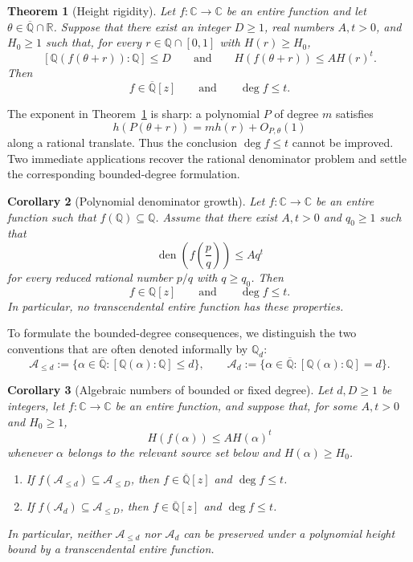 \documentclass[11pt]{amsart}
\newtheorem{theorem}{Theorem}[section]
\newtheorem{corollary}[theorem]{Corollary}
\theoremstyle{remark}
\newcommand{\Q}{\mathbb{Q}}
\newcommand{\R}{\mathbb{R}}
\newcommand{\C}{\mathbb{C}}
\newcommand{\Qbar}{\overline{\mathbb{Q}}}
\newcommand{\Aatmost}[1]{\mathcal{A}_{\leq #1}}
\newcommand{\Aexact}[1]{\mathcal{A}_{#1}}
\DeclareMathOperator{\den}{den}
\begin{document}
\begin{theorem}[Height rigidity]\label{thm:rigidity}
Let $f:\C\to\C$ be an entire function and let $\theta\in\Qbar\cap\R$. Suppose that there exist an integer $D\geq1$, real numbers $A,t>0$, and $H_0\geq1$ such that, for every $r\in\Q\cap[0,1]$ with $H(r)\geq H_0$,
\begin{equation}\label{eq:intro-assumptions}
[\Q(f(\theta+r)):\Q]\leq D
\qquad\text{and}\qquad
H(f(\theta+r))\leq A H(r)^t.
\end{equation}
Then
\[
f\in\Qbar[z]
\qquad\text{and}\qquad
\deg f\leq t.
\]
\end{theorem}

The exponent in Theorem~\ref{thm:rigidity} is sharp: a polynomial $P$ of degree $m$ satisfies
\[
h(P(\theta+r))=m h(r)+O_{P,\theta}(1)
\]
along a rational translate. Thus the conclusion $\deg f\leq t$ cannot be improved. Two immediate applications recover the rational denominator problem and settle the corresponding bounded-degree formulation.

\begin{corollary}[Polynomial denominator growth]\label{cor:rational}
Let $f:\C\to\C$ be an entire function such that $f(\Q)\subseteq\Q$. Assume that there exist $A,t>0$ and $q_0\geq1$ such that
\[
\den\!\left(f\!\left(\frac pq\right)\right)
\leq A q^t
\]
for every reduced rational number $p/q$ with $q\geq q_0$. Then
\[
f\in\Q[z]
\qquad\text{and}\qquad
\deg f\leq t.
\]
In particular, no transcendental entire function has these properties.
\end{corollary}

To formulate the bounded-degree consequences, we distinguish the two conventions that are often denoted informally by $\Q_d$:
\[
\Aatmost{d}
:=\{\alpha\in\Qbar:[\Q(\alpha):\Q]\leq d\},
\qquad
\Aexact{d}
:=\{\alpha\in\Qbar:[\Q(\alpha):\Q]=d\}.
\]

\begin{corollary}[Algebraic numbers of bounded or fixed degree]\label{cor:degree}
Let $d,D\geq1$ be integers, let $f:\C\to\C$ be an entire function, and suppose that, for some $A,t>0$ and $H_0\geq1$,
\[
H(f(\alpha))\leq A H(\alpha)^t
\]
whenever $\alpha$ belongs to the relevant source set below and $H(\alpha)\geq H_0$.

\begin{enumerate}
\item If $f(\Aatmost{d})\subseteq\Aatmost{D}$, then $f\in\Qbar[z]$ and $\deg f\leq t$.
\item If $f(\Aexact{d})\subseteq\Aatmost{D}$, then $f\in\Qbar[z]$ and $\deg f\leq t$.
\end{enumerate}

In particular, neither $\Aatmost{d}$ nor $\Aexact{d}$ can be preserved under a polynomial height bound by a transcendental entire function.
\end{corollary}
\end{document}
